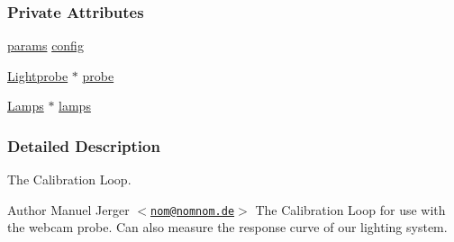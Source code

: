 \subsubsection*{\-Private \-Attributes}
\begin{DoxyCompactItemize}
\item 
\hyperlink{structCalibrate_1_1params}{params} \hyperlink{classCalibrate_ab03f352d65f3ad6ae97d4706066b0ea2}{config}
\item 
\hyperlink{classLightprobe}{\-Lightprobe} $\ast$ \hyperlink{classCalibrate_a67a7afddb9f985155355c8d6705d4e63}{probe}
\item 
\hyperlink{classLamps}{\-Lamps} $\ast$ \hyperlink{classCalibrate_ad21c76042bc2ea7b864c049d5f3ef531}{lamps}
\end{DoxyCompactItemize}


\subsubsection{\-Detailed \-Description}
\-The \-Calibration \-Loop. 

\begin{DoxyAuthor}{\-Author}
\-Manuel \-Jerger $<$\href{mailto:nom@nomnom.de}{\tt nom@nomnom.\-de}$>$ \-The \-Calibration \-Loop for use with the webcam probe. \-Can also measure the response curve of our lighting system. 
\end{DoxyAuthor}



